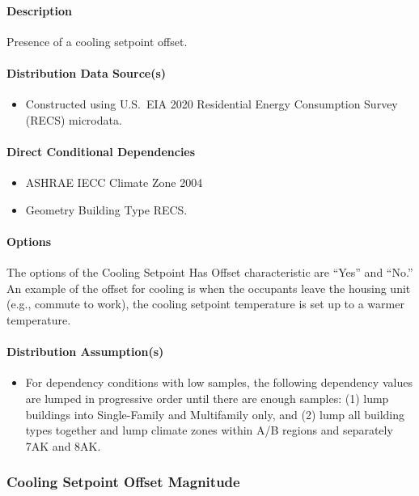 \paragraph{Description}
Presence of a cooling setpoint offset.

\paragraph{Distribution Data Source(s)}
\begin{itemize}
    \item Constructed using U.S.~EIA 2020 Residential Energy Consumption Survey (RECS) microdata.
\end{itemize}

\paragraph{Direct Conditional Dependencies}
\begin{itemize}
    \item ASHRAE IECC Climate Zone 2004
    \item Geometry Building Type RECS.
\end{itemize}

\paragraph{Options}
The options of the Cooling Setpoint Has Offset characteristic are ``Yes'' and ``No.'' An example of the offset for cooling is when the occupants leave the housing unit (e.g., commute to work), the cooling setpoint temperature is set up to a warmer temperature.

\paragraph{Distribution Assumption(s)}
\begin{itemize}
    \item For dependency conditions with low samples, the following dependency values are lumped in progressive order until there are enough samples: (1) lump buildings into Single-Family and Multifamily only, and (2) lump all building types together and lump climate zones within A/B regions and separately 7AK and 8AK.
\end{itemize}

\subsubsection{Cooling Setpoint Offset Magnitude}
